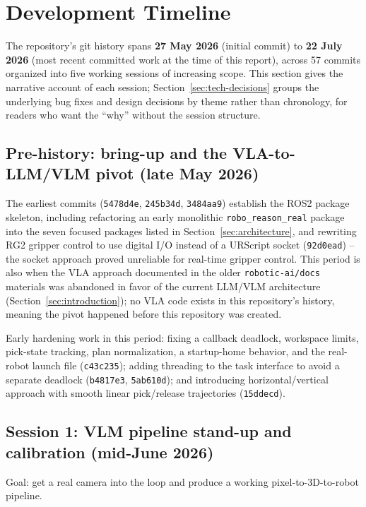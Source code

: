 \section{Development Timeline}
\label{sec:timeline}

The repository's git history spans \textbf{27 May 2026} (initial commit) to
\textbf{22 July 2026} (most recent committed work at the time of this
report), across 57 commits organized into five working sessions of
increasing scope. This section gives the narrative account of each session;
Section~\ref{sec:tech-decisions} groups the underlying bug fixes and design
decisions by theme rather than chronology, for readers who want the ``why''
without the session structure.

\subsection{Pre-history: bring-up and the VLA-to-LLM/VLM pivot (late May 2026)}

The earliest commits (\texttt{5478d4e}, \texttt{245b34d}, \texttt{3484aa9})
establish the ROS2 package skeleton, including refactoring an early
monolithic \texttt{robo\_reason\_real} package into the seven focused
packages listed in Section~\ref{sec:architecture}, and rewriting RG2 gripper
control to use digital I/O instead of a URScript socket (\texttt{92d0ead}) --
the socket approach proved unreliable for real-time gripper control. This
period is also when the VLA approach documented in the older
\texttt{robotic-ai/docs} materials was abandoned in favor of the current
LLM/VLM architecture (Section~\ref{sec:introduction}); no VLA code exists in
this repository's history, meaning the pivot happened before this repository
was created.

Early hardening work in this period: fixing a callback deadlock, workspace
limits, pick-state tracking, plan normalization, a startup-home behavior, and
the real-robot launch file (\texttt{c43c235}); adding threading to the task
interface to avoid a separate deadlock (\texttt{b4817e3},
\texttt{5ab610d}); and introducing horizontal/vertical approach with smooth
linear pick/release trajectories (\texttt{15ddecd}).

\subsection{Session 1: VLM pipeline stand-up and calibration (mid-June 2026)}

Goal: get a real camera into the loop and produce a working
pixel-to-3D-to-robot pipeline.

